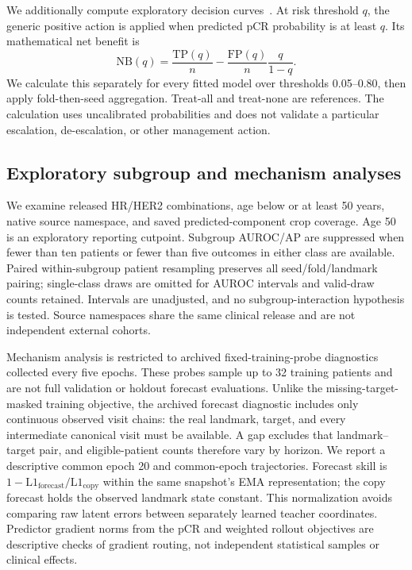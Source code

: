 We additionally compute exploratory decision curves~\citep{vickers2006dca}. At risk threshold $q$, the generic positive action is applied when predicted pCR probability is at least $q$. Its mathematical net benefit is
\begin{equation}
 \mathrm{NB}(q)=\frac{\mathrm{TP}(q)}{n}
 -\frac{\mathrm{FP}(q)}{n}\frac{q}{1-q}.
\end{equation}
We calculate this separately for every fitted model over thresholds 0.05--0.80, then apply fold-then-seed aggregation. Treat-all and treat-none are references. The calculation uses uncalibrated probabilities and does not validate a particular escalation, de-escalation, or other management action.

\subsection{Exploratory subgroup and mechanism analyses}
We examine released HR/HER2 combinations, age below or at least 50 years, native source namespace, and saved predicted-component crop coverage. Age 50 is an exploratory reporting cutpoint. Subgroup AUROC/AP are suppressed when fewer than ten patients or fewer than five outcomes in either class are available. Paired within-subgroup patient resampling preserves all seed/fold/landmark pairing; single-class draws are omitted for AUROC intervals and valid-draw counts retained. Intervals are unadjusted, and no subgroup-interaction hypothesis is tested. Source namespaces share the same clinical release and are not independent external cohorts.

Mechanism analysis is restricted to archived fixed-training-probe diagnostics collected every five epochs. These probes sample up to 32 training patients and are not full validation or holdout forecast evaluations. Unlike the missing-target-masked training objective, the archived forecast diagnostic includes only continuous observed visit chains: the real landmark, target, and every intermediate canonical visit must be available. A gap excludes that landmark--target pair, and eligible-patient counts therefore vary by horizon. We report a descriptive common epoch 20 and common-epoch trajectories. Forecast skill is $1-\mathrm{L1}_{\mathrm{forecast}}/\mathrm{L1}_{\mathrm{copy}}$ within the same snapshot's EMA representation; the copy forecast holds the observed landmark state constant. This normalization avoids comparing raw latent errors between separately learned teacher coordinates. Predictor gradient norms from the pCR and weighted rollout objectives are descriptive checks of gradient routing, not independent statistical samples or clinical effects.

